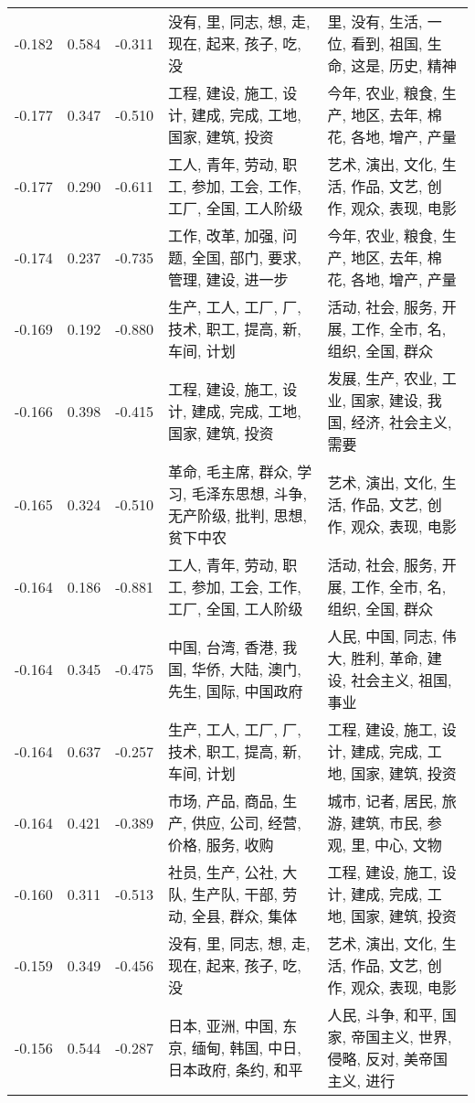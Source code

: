 \begin{tabular}{cccp{5cm}p{5cm}}
-0.182 & 0.584 & -0.311 & 没有, 里, 同志, 想, 走, 现在, 起来, 孩子, 吃, 没 & 里, 没有, 生活, 一位, 看到, 祖国, 生命, 这是, 历史, 精神 \\
-0.177 & 0.347 & -0.510 & 工程, 建设, 施工, 设计, 建成, 完成, 工地, 国家, 建筑, 投资 & 今年, 农业, 粮食, 生产, 地区, 去年, 棉花, 各地, 增产, 产量 \\
-0.177 & 0.290 & -0.611 & 工人, 青年, 劳动, 职工, 参加, 工会, 工作, 工厂, 全国, 工人阶级 & 艺术, 演出, 文化, 生活, 作品, 文艺, 创作, 观众, 表现, 电影 \\
-0.174 & 0.237 & -0.735 & 工作, 改革, 加强, 问题, 全国, 部门, 要求, 管理, 建设, 进一步 & 今年, 农业, 粮食, 生产, 地区, 去年, 棉花, 各地, 增产, 产量 \\
-0.169 & 0.192 & -0.880 & 生产, 工人, 工厂, 厂, 技术, 职工, 提高, 新, 车间, 计划 & 活动, 社会, 服务, 开展, 工作, 全市, 名, 组织, 全国, 群众 \\
-0.166 & 0.398 & -0.415 & 工程, 建设, 施工, 设计, 建成, 完成, 工地, 国家, 建筑, 投资 & 发展, 生产, 农业, 工业, 国家, 建设, 我国, 经济, 社会主义, 需要 \\
-0.165 & 0.324 & -0.510 & 革命, 毛主席, 群众, 学习, 毛泽东思想, 斗争, 无产阶级, 批判, 思想, 贫下中农 & 艺术, 演出, 文化, 生活, 作品, 文艺, 创作, 观众, 表现, 电影 \\
-0.164 & 0.186 & -0.881 & 工人, 青年, 劳动, 职工, 参加, 工会, 工作, 工厂, 全国, 工人阶级 & 活动, 社会, 服务, 开展, 工作, 全市, 名, 组织, 全国, 群众 \\
-0.164 & 0.345 & -0.475 & 中国, 台湾, 香港, 我国, 华侨, 大陆, 澳门, 先生, 国际, 中国政府 & 人民, 中国, 同志, 伟大, 胜利, 革命, 建设, 社会主义, 祖国, 事业 \\
-0.164 & 0.637 & -0.257 & 生产, 工人, 工厂, 厂, 技术, 职工, 提高, 新, 车间, 计划 & 工程, 建设, 施工, 设计, 建成, 完成, 工地, 国家, 建筑, 投资 \\
-0.164 & 0.421 & -0.389 & 市场, 产品, 商品, 生产, 供应, 公司, 经营, 价格, 服务, 收购 & 城市, 记者, 居民, 旅游, 建筑, 市民, 参观, 里, 中心, 文物 \\
-0.160 & 0.311 & -0.513 & 社员, 生产, 公社, 大队, 生产队, 干部, 劳动, 全县, 群众, 集体 & 工程, 建设, 施工, 设计, 建成, 完成, 工地, 国家, 建筑, 投资 \\
-0.159 & 0.349 & -0.456 & 没有, 里, 同志, 想, 走, 现在, 起来, 孩子, 吃, 没 & 艺术, 演出, 文化, 生活, 作品, 文艺, 创作, 观众, 表现, 电影 \\
-0.156 & 0.544 & -0.287 & 日本, 亚洲, 中国, 东京, 缅甸, 韩国, 中日, 日本政府, 条约, 和平 & 人民, 斗争, 和平, 国家, 帝国主义, 世界, 侵略, 反对, 美帝国主义, 进行 \\

\end{tabular}
